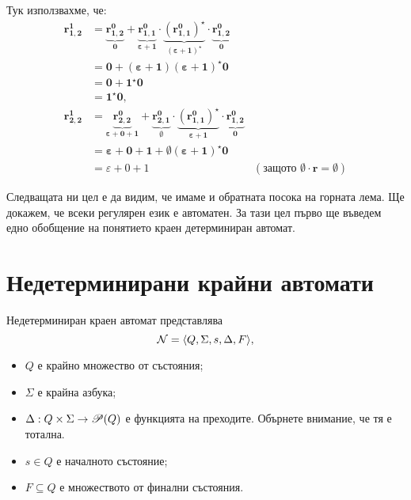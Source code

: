 \begin{example}
  Тук използвахме, че:
  \begin{align*}
    \mathbf{r^1_{1,2}} & = \underbrace{\mathbf{r^0_{1,2}}}_{\mathbf{0}} + \underbrace{\mathbf{r^0_{1,1}}}_{\mathbf{\varepsilon + 1}}\cdot\underbrace{\mathbf{(r^0_{1,1})^\star}}_{\mathbf{(\varepsilon+1)^\star}} \cdot \underbrace{\mathbf{r^0_{1,2}}}_{\mathbf{0}}\\
    & = \mathbf{0 + (\varepsilon + 1)(\varepsilon + 1)^\star0} \\
    & = \mathbf{0 + 1^\star 0}\\
    & = \mathbf{1^\star0},\\
    \mathbf{r^1_{2,2}} & = \underbrace{\mathbf{r^0_{2,2}}}_{\mathbf{\varepsilon+0+1}} + \underbrace{\mathbf{r^0_{2,1}}}_{\mathbf{\emptyset}} \cdot \underbrace{\mathbf{(r^0_{1,1})^\star}}_{\mathbf{\varepsilon+1}}\cdot \underbrace{\mathbf{r^0_{1,2}}}_{\mathbf{0}}\\
    & = \mathbf{\varepsilon + 0 + 1 + \emptyset(\varepsilon + 1)^\star0}\\
    & = \varepsilon + 0 + 1 & (\text{защото }\mathbf{\emptyset \cdot r = \emptyset})
  \end{align*}
\end{example}

Следващата ни цел е да видим, че имаме и обратната посока на горната лема.
Ще докажем, че всеки регулярен език е автоматен. За тази цел първо ще 
въведем едно обобщение на понятието краен детерминиран автомат.

\section{Недетерминирани крайни автомати}
\begin{dfn}
  Недетерминиран краен автомат представлява
  \[\mathcal{N} = \langle{Q,\Sigma,s,\Delta,F}\rangle,\]
  \begin{itemize}
  \item
    $Q$ е крайно множество от състояния;
  \item
    $\Sigma$ е крайна азбука;
  \item
    $\Delta: Q\times\Sigma \to \mathscr{P}(Q)$ е функцията на преходите.
    Обърнете внимание, че тя е тотална.
  \item
    $s \in Q$ е началното състояние;
  \item
    $F\subseteq Q$ е множеството от финални състояния.
  \end{itemize}
\end{dfn}

